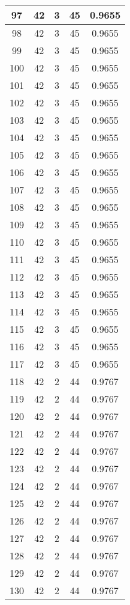 \documentclass[letterpaper, 12pt]{article}
\begin{document}
\begin{longtable}{|c|c|c|c|c|}
\hline
97 & 42 & 3 & 45 & 0.9655 \\
\hline
98 & 42 & 3 & 45 & 0.9655 \\
\hline
99 & 42 & 3 & 45 & 0.9655 \\
\hline
100 & 42 & 3 & 45 & 0.9655 \\
\hline
101 & 42 & 3 & 45 & 0.9655 \\
\hline
102 & 42 & 3 & 45 & 0.9655 \\
\hline
103 & 42 & 3 & 45 & 0.9655 \\
\hline
104 & 42 & 3 & 45 & 0.9655 \\
\hline
105 & 42 & 3 & 45 & 0.9655 \\
\hline
106 & 42 & 3 & 45 & 0.9655 \\
\hline
107 & 42 & 3 & 45 & 0.9655 \\
\hline
108 & 42 & 3 & 45 & 0.9655 \\
\hline
109 & 42 & 3 & 45 & 0.9655 \\
\hline
110 & 42 & 3 & 45 & 0.9655 \\
\hline
111 & 42 & 3 & 45 & 0.9655 \\
\hline
112 & 42 & 3 & 45 & 0.9655 \\
\hline
113 & 42 & 3 & 45 & 0.9655 \\
\hline
114 & 42 & 3 & 45 & 0.9655 \\
\hline
115 & 42 & 3 & 45 & 0.9655 \\
\hline
116 & 42 & 3 & 45 & 0.9655 \\
\hline
117 & 42 & 3 & 45 & 0.9655 \\
\hline
118 & 42 & 2 & 44 & 0.9767 \\
\hline
119 & 42 & 2 & 44 & 0.9767 \\
\hline
120 & 42 & 2 & 44 & 0.9767 \\
\hline
121 & 42 & 2 & 44 & 0.9767 \\
\hline
122 & 42 & 2 & 44 & 0.9767 \\
\hline
123 & 42 & 2 & 44 & 0.9767 \\
\hline
124 & 42 & 2 & 44 & 0.9767 \\
\hline
125 & 42 & 2 & 44 & 0.9767 \\
\hline
126 & 42 & 2 & 44 & 0.9767 \\
\hline
127 & 42 & 2 & 44 & 0.9767 \\
\hline
128 & 42 & 2 & 44 & 0.9767 \\
\hline
129 & 42 & 2 & 44 & 0.9767 \\
\hline
130 & 42 & 2 & 44 & 0.9767 \\

\end{longtable}
\end{document}
